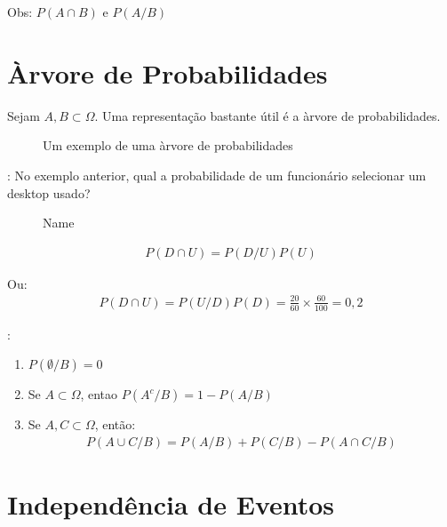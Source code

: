 \documentclass[11pt,a4paper]{book}
\begin{document}
\begin{description}
\begin{description}
        Obs: $P(A \cap B)$ e $P(A/B)$
    \end{description}
    \section{Àrvore de Probabilidades}
    Sejam $A,B \subset \Omega$. Uma representação bastante útil é a àrvore de probabilidades.
    \begin{description}
      \begin{figure}
        \label{fig:17}
        \caption{Um exemplo de uma àrvore de probabilidades}
      \end{figure}

    \item[Exemplo]: No exemplo anterior, qual a probabilidade de um funcionário selecionar um 
      desktop usado?
      \begin{figure}[htpb]
        \centering
        \caption{Name}
        \label{fig:18}
      \end{figure}
      \begin{align*}
        P(D \cap U)= P(D/U)P(U)
      \end{align*}

      Ou:
      \begin{align*}
        P(D \cap U)= P(U/D)P(D)= \frac{20}{60}\times \frac{60}{100}= 0,2
      \end{align*}

    \item [Algumas propriedades]:
      \begin{enumerate}[label=(\alph*)]
        \item $P(\emptyset / B)=0$
        \item Se $A \subset \Omega$, entao $P(A^c / B)= 1-P(A/B)$
        \item Se $A,C \subset \Omega$, então:
          \begin{align}
            P(A \cup C / B)= P(A/B)+ P(C/B) - P(A \cap C/B)
          \end{align}
      \end{enumerate}

  \end{description}
  \section{Independência de Eventos}


\end{description}
\end{document}
